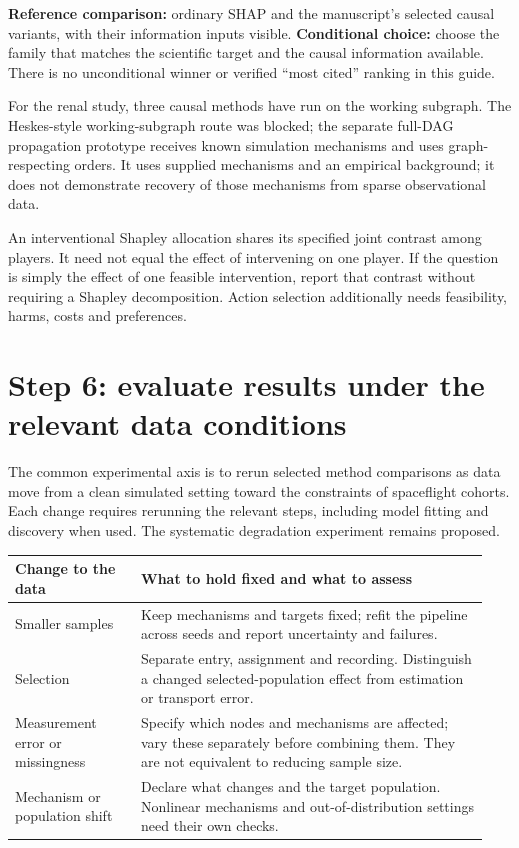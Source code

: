 \documentclass[11pt,letterpaper]{article}
\begin{document}
\textbf{Reference comparison:} ordinary SHAP and the manuscript's selected causal variants, with their information inputs visible. \textbf{Conditional choice:} choose the family that matches the scientific target and the causal information available. There is no unconditional winner or verified ``most cited'' ranking in this guide.

For the renal study, three causal methods have run on the working subgraph. The Heskes-style working-subgraph route was blocked; the separate full-DAG propagation prototype receives known simulation mechanisms and uses graph-respecting orders. It uses supplied mechanisms and an empirical background; it does not demonstrate recovery of those mechanisms from sparse observational data.

An interventional Shapley allocation shares its specified joint contrast among players. It need not equal the effect of intervening on one player. If the question is simply the effect of one feasible intervention, report that contrast without requiring a Shapley decomposition. Action selection additionally needs feasibility, harms, costs and preferences.

\clearpage
\section*{Step 6: evaluate results under the relevant data conditions}

The common experimental axis is to rerun selected method comparisons as data move from a clean simulated setting toward the constraints of spaceflight cohorts. Each change requires rerunning the relevant steps, including model fitting and discovery when used. The systematic degradation experiment remains proposed.

\begingroup\small\setlength{\tabcolsep}{5pt}
\begin{longtable}{@{}L{0.25\linewidth}L{0.69\linewidth}@{}}
\toprule Change to the data & What to hold fixed and what to assess\\\midrule\endhead
Smaller samples & Keep mechanisms and targets fixed; refit the pipeline across seeds and report uncertainty and failures.\\[4pt]
Selection & Separate entry, assignment and recording. Distinguish a changed selected-population effect from estimation or transport error.\\[4pt]
Measurement error or missingness & Specify which nodes and mechanisms are affected; vary these separately before combining them. They are not equivalent to reducing sample size.\\[4pt]
Mechanism or population shift & Declare what changes and the target population. Nonlinear mechanisms and out-of-distribution settings need their own checks.\\
\bottomrule
\end{longtable}\endgroup
\end{document}
